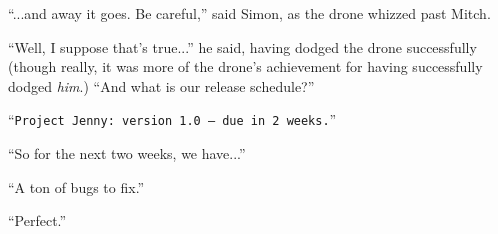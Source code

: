 \documentclass[10pt,a4paper]{article}
\newcommand{\lang}[2]{ #2 \par}
\newcommand{\ai}[2]{
	\lang{
		-- \texttt{#1}
	}{
		``\texttt{#2}''
	}
}
\newcommand{\ainame}{Jenny}
\newcommand{\mainname}{Simon}
\newcommand{\auxname}{Mitch}
\begin{document}
\lang{-- ...и вот он летит. Осторожнее, -- сказал \mainname{}, пока дрон пролетал рядом с \auxname{}.}{``...and away it goes. Be careful,'' said \mainname{}, as the drone whizzed past \auxname{}.}

\lang{-- Ну, это может быть и так... -- он сказал, успешно уклонившись от дрона (хотя на самом деле это у дрона получилось успешно уклониться от \emph{него}.) А что у нас с расписанием?}{``Well, I suppose that's true...'' he said, having dodged the drone successfully (though really, it was more of the drone's achievement for having successfully dodged \emph{him}.) ``And what is our release schedule?''}

\ai{Проект \ainame{}: версия 1.0 -- срок: 2 недели.}{Project \ainame{}: version 1.0 -- due in 2 weeks.}

\lang{-- А значит на следующие две недели, у нас...}{``So for the next two weeks, we have...''}

\lang{-- Надо починить кучу багов.}{``A ton of bugs to fix.''}

\lang{-- Отлично.}{``Perfect.''}

\noindent\makebox[\linewidth]{\rule{\paperwidth}{0.4pt}}
\end{document}
